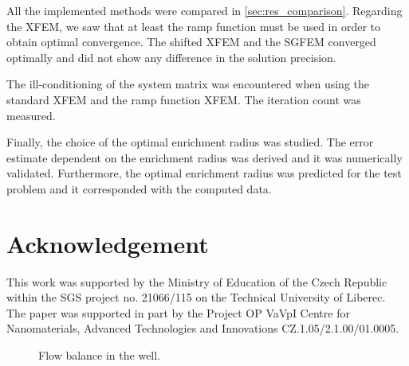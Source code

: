 \documentclass{elsarticle}
\newcommand{\figpath}{../graphics/}
\begin{document}
All the implemented methods were compared in \ref{sec:res_comparison}. Regarding the XFEM, we saw that at 
least the ramp function must be used in order to obtain optimal convergence. The shifted XFEM and 
the SGFEM converged optimally and did not show any difference in the solution precision.

The ill-conditioning of the system matrix was encountered when using the standard XFEM and the ramp function XFEM.
The iteration count was measured.

Finally, the choice of the optimal enrichment radius was studied. The error estimate dependent on the enrichment
radius was derived and it was numerically validated. Furthermore, the optimal enrichment radius was predicted 
for the test problem and it corresponded with the computed data.

\section{Acknowledgement}
This work was supported by the Ministry of Education of the Czech Republic within the SGS project 
no. 21066/115 on the Technical University of Liberec. The paper was supported in part by the Project OP
VaVpI Centre for Nanomaterials, Advanced Technologies  and Innovations
CZ.1.05/2.1.00/01.0005.






% 
% 
% 
  
 
 
 
 \newpage
 \begin{figure}[!htb]
  \begin{center}         
    \def\svgwidth{0.5\textwidth}
    
  \end{center}
  \caption{Flow balance in the well.}
  \label{fig:well_flows}
\end{figure}
\end{document}
